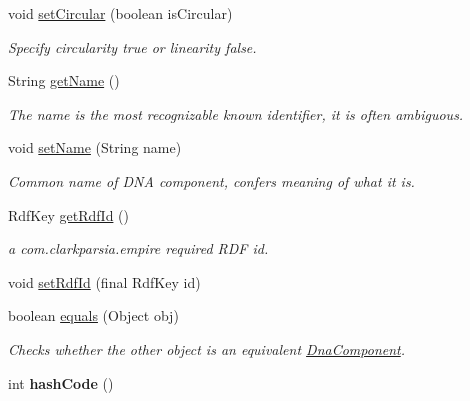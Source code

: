 \begin{DoxyCompactItemize}
void \hyperlink{classorg_1_1sbolstandard_1_1lib_s_b_o_lj_1_1_dna_component_aa985eba9ff6208a84c0da097ade01781}{setCircular} (boolean isCircular)
\begin{DoxyCompactList}\small\item\em Specify circularity {\ttfamily true} or linearity {\ttfamily false}. \item\end{DoxyCompactList}\item 
String \hyperlink{classorg_1_1sbolstandard_1_1lib_s_b_o_lj_1_1_dna_component_a78ee178b6a73658d65ca60da4d1e6683}{getName} ()
\begin{DoxyCompactList}\small\item\em The name is the most recognizable known identifier, it is often ambiguous. \item\end{DoxyCompactList}\item 
void \hyperlink{classorg_1_1sbolstandard_1_1lib_s_b_o_lj_1_1_dna_component_ad737b36b74be994e0d8420797ed72f78}{setName} (String name)
\begin{DoxyCompactList}\small\item\em Common name of DNA component, confers meaning of what it is. \item\end{DoxyCompactList}\item 
RdfKey \hyperlink{classorg_1_1sbolstandard_1_1lib_s_b_o_lj_1_1_dna_component_a98d34c30847c78a8922be878a2fa4d49}{getRdfId} ()
\begin{DoxyCompactList}\small\item\em a com.clarkparsia.empire required RDF id. \item\end{DoxyCompactList}\item 
void \hyperlink{classorg_1_1sbolstandard_1_1lib_s_b_o_lj_1_1_dna_component_afe8d2a1ced8871ba217ddf364366da99}{setRdfId} (final RdfKey id)
\item 
boolean \hyperlink{classorg_1_1sbolstandard_1_1lib_s_b_o_lj_1_1_dna_component_ae3ce8ca5a04e8966a9d2158aeeecfc16}{equals} (Object obj)
\begin{DoxyCompactList}\small\item\em Checks whether the other object is an equivalent \hyperlink{classorg_1_1sbolstandard_1_1lib_s_b_o_lj_1_1_dna_component}{DnaComponent}. \item\end{DoxyCompactList}\item 
\hypertarget{classorg_1_1sbolstandard_1_1lib_s_b_o_lj_1_1_dna_component_a077e18fe97323c7194e2665ffc766399}{
int {\bfseries hashCode} ()}
\label{classorg_1_1sbolstandard_1_1lib_s_b_o_lj_1_1_dna_component_a077e18fe97323c7194e2665ffc766399}

\end{DoxyCompactItemize}
